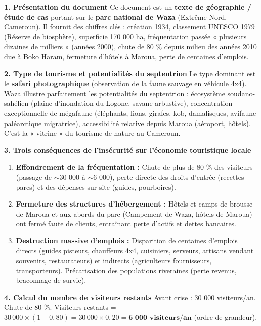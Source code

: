 \documentclass[11pt]{article}
\begin{document}
\begin{corrige}

\textbf{1. Présentation du document}
Ce document est un \textbf{texte de géographie / étude de cas} portant sur le \textbf{parc national de Waza} (Extrême-Nord, Cameroun). Il fournit des chiffres clés : création 1934, classement UNESCO 1979 (Réserve de biosphère), superficie 170 000 ha, fréquentation passée « plusieurs dizaines de milliers » (années 2000), chute de 80 \% depuis milieu des années 2010 due à Boko Haram, fermeture d'hôtels à Maroua, perte de centaines d'emplois.

\textbf{2. Type de tourisme et potentialités du septentrion}
Le type dominant est le \textbf{safari photographique} (observation de la faune sauvage en véhicule 4x4). Waza illustre parfaitement les potentialités du septentrion : écosystème soudano-sahélien (plaine d'inondation du Logone, savane arbustive), concentration exceptionnelle de mégafaune (éléphants, lions, girafes, kob, damalisques, avifaune paléarctique migratrice), accessibilité relative depuis Maroua (aéroport, hôtels). C'est la « vitrine » du tourisme de nature au Cameroun.

\textbf{3. Trois conséquences de l'insécurité sur l'économie touristique locale}
\begin{enumerate}
\item \textbf{Effondrement de la fréquentation :} Chute de plus de 80 \% des visiteurs (passage de $\sim$30 000 à $\sim$6 000), perte directe des droits d'entrée (recettes parcs) et des dépenses sur site (guides, pourboires).
\item \textbf{Fermeture des structures d'hébergement :} Hôtels et camps de brousse de Maroua et aux abords du parc (Campement de Waza, hôtels de Maroua) ont fermé faute de clients, entraînant perte d'actifs et dettes bancaires.
\item \textbf{Destruction massive d'emplois :} Disparition de centaines d'emplois directs (guides pisteurs, chauffeurs 4x4, cuisiniers, serveurs, artisans vendant souvenirs, restaurateurs) et indirects (agriculteurs fournisseurs, transporteurs). Précarisation des populations riveraines (perte revenus, braconnage de survie).
\end{enumerate}

\textbf{4. Calcul du nombre de visiteurs restants}
Avant crise : 30 000 visiteurs/an. Chute de 80 \%.
Visiteurs restants = $30\,000 \times (1 - 0,80) = 30\,000 \times 0,20 = \textbf{6 000 visiteurs/an}$ (ordre de grandeur).


\end{corrige}
\end{document}
